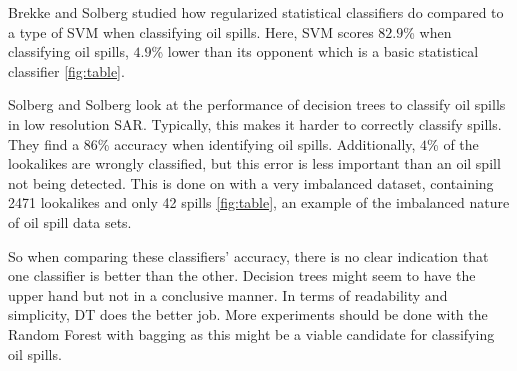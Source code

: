 Brekke and Solberg \cite{brekke2008classifiers} studied how regularized statistical classifiers do compared to a type of SVM when classifying oil spills. Here, SVM scores $82.9$\% when classifying oil spills, $4.9$\% lower than its opponent which is a basic statistical classifier \ref{fig:table}. 

Solberg and Solberg \cite{Delfrate2004} look at the performance of decision trees to classify oil spills in low resolution SAR. Typically, this makes it harder to correctly classify spills. They find a $86$\% accuracy when identifying oil spills. Additionally, $4$\% of the lookalikes are wrongly classified, but this error is less important than an oil spill not being detected. This is done on with a very imbalanced dataset, containing 2471 lookalikes and only 42 spills \ref{fig:table}, an example of the imbalanced nature of oil spill data sets.

So when comparing these classifiers' accuracy, there is no clear indication that one classifier is better than the other. Decision trees might seem to have the upper hand but not in a conclusive manner. In terms of readability and simplicity, DT does the better job. More experiments should be done with the Random Forest with bagging as this might be a viable candidate for classifying oil spills.